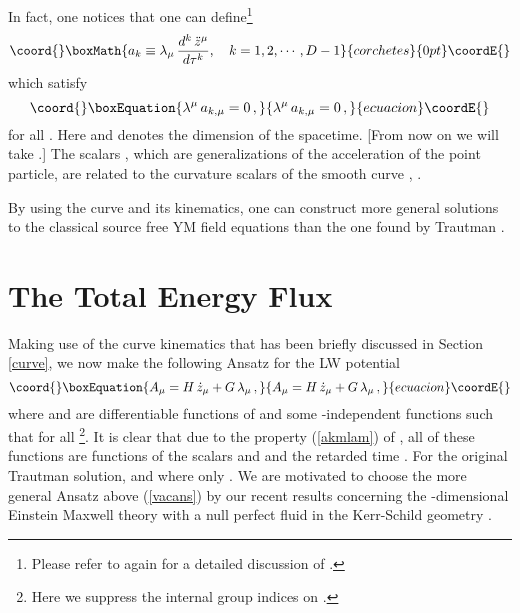 \documentclass[a4paper,twocolumn,prd,showpacs,amsmath,amssymb]{revtex4}
\begin{document}
In fact, one notices that one can define\footnote{Please refer to \cite{gs1}
again for a detailed discussion of \coordHE{}.}
\[\coord{}\boxMath{ a_{k} \equiv \lambda_{\mu} \, \frac{d^k \, \ddot{z}^{\mu}}{d \tau^k},
~~~k=1,2,\cdots ,D-1 }{corchetes}{0pt}\coordE{}\] which satisfy
\begin{equation}\coord{}\boxEquation{
\lambda^{\mu} \, a_{k,\mu} = 0 \, , \label{akmlam}
}{
\lambda^{\mu} \, a_{k,\mu} = 0 \, , }{ecuacion}\coordE{}\end{equation}
for all \coordHE{}. Here \coordHE{} and \coordHE{} denotes the dimension of the spacetime.
[From now on we will take \coordHE{}.] The scalars \coordHE{}, which are
generalizations of the acceleration \coordHE{} of the point particle, are related
to the curvature scalars of the smooth curve \coordHE{} \cite{spi}, \cite{gs1}.

By using the curve \coordHE{} and its kinematics, one can construct more general
solutions to the classical source free YM field equations than the one
found by Trautman \cite{traut}.

\section{\label{enflux} The Total Energy Flux}

Making use of the curve kinematics that has been briefly discussed in
Section \ref{curve}, we now make the following Ansatz for the LW potential
\begin{equation}\coord{}\boxEquation{
A_{\mu} = H \, \dot{z}_{\mu} + G \, \lambda_{\mu} \, , \label{vacans}
}{
A_{\mu} = H \, \dot{z}_{\mu} + G \, \lambda_{\mu} \, , }{ecuacion}\coordE{}\end{equation}
where \coordHE{} and \coordHE{} are differentiable functions of \coordHE{} and some \coordHE{}-independent
functions \coordHE{} such that \coordHE{}
for all \coordHE{}\footnote{Here we suppress the internal group indices on \coordHE{}.}. It
is clear that due to the property (\ref{akmlam}) of \coordHE{}, all of these
functions \coordHE{} are functions of the scalars \coordHE{} and \coordHE{}
and the retarded time \myHighlight{$\tau$}\coordHE{}. For the original Trautman solution, \coordHE{}
and \coordHE{} where \coordHE{} only \cite{traut}. We are motivated to
choose the more general Ansatz above (\ref{vacans}) by our recent results
concerning the \coordHE{}-dimensional Einstein Maxwell theory with a null perfect
fluid in the Kerr-Schild geometry \cite{gs1}.
\end{document}
